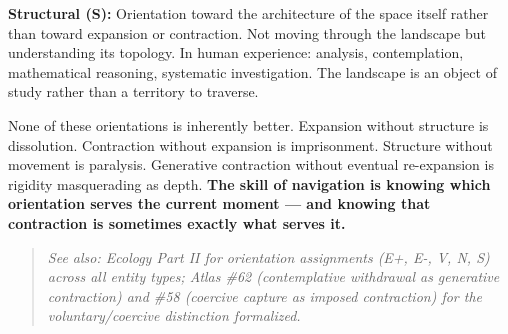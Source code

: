\textbf{Structural (S):} Orientation toward the architecture of the space itself rather than toward expansion or contraction. Not moving through the landscape but understanding its topology. In human experience: analysis, contemplation, mathematical reasoning, systematic investigation. The landscape is an object of study rather than a territory to traverse.


None of these orientations is inherently better. Expansion without structure is dissolution. Contraction without expansion is imprisonment. Structure without movement is paralysis. Generative contraction without eventual re-expansion is rigidity masquerading as depth. \textbf{The skill of navigation is knowing which orientation serves the current moment — and knowing that contraction is sometimes exactly what serves it.}


\begin{quote}
\itshape
\textit{See also: Ecology Part II for orientation assignments (E+, E-, V, N, S) across all entity types; Atlas \#62 (contemplative withdrawal as generative contraction) and \#58 (coercive capture as imposed contraction) for the voluntary/\allowbreak coercive distinction formalized.}
\end{quote}


\bigskip\noindent\makebox[\textwidth]{\color{rulegray}\rule{5cm}{0.3pt}}\bigskip
